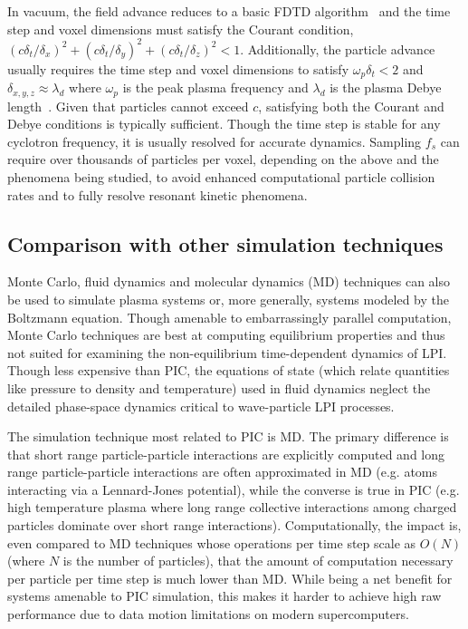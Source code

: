 \documentclass[journal,twoside]{IEEEtran}
\begin{document}
In vacuum, the field advance reduces to a basic FDTD
algorithm~\cite{Yee_1966} and the time step and voxel dimensions must
satisfy the Courant condition, $\left(c\delta_t/\delta_x\right)^2 +
\left(c\delta_t/\delta_y\right)^2 + \left(c\delta_t/\delta_z\right)^2
< 1$.  Additionally, the particle advance usually requires the time
step and voxel dimensions to satisfy $\omega_p \delta_t < 2$ and
$\delta_{x,y,z} \approx \lambda_d$ where $\omega_p$ is the peak plasma
frequency and $\lambda_d$ is the plasma Debye
length~\cite{Birdsall_Langdon_1985,Hockney_Eastwood_1988}.  Given that
particles cannot exceed $c$, satisfying both the Courant and Debye
conditions is typically sufficient.  Though the time step is stable
for any cyclotron frequency, it is usually resolved for accurate
dynamics.  Sampling $f_s$ can require over thousands of particles per
voxel, depending on the above and the phenomena being studied, to avoid
enhanced computational particle collision rates and to fully resolve
resonant kinetic phenomena.

\subsection{Comparison with other simulation techniques}

Monte Carlo, fluid dynamics and molecular dynamics (MD) techniques can
also be used to simulate plasma systems or, more generally, systems
modeled by the Boltzmann equation.  Though amenable to embarrassingly
parallel computation, Monte Carlo techniques are best at computing
equilibrium properties and thus not suited for examining the
non-equilibrium time-dependent dynamics of LPI.  Though less expensive
than PIC, the equations of state (which relate quantities like
pressure to density and temperature) used in fluid dynamics neglect
the detailed phase-space dynamics critical to wave-particle LPI
processes.

The simulation technique most related to PIC is MD.  The primary
difference is that short range particle-particle interactions are
explicitly computed and long range particle-particle interactions are
often approximated in MD (e.g. atoms interacting via a Lennard-Jones
potential), while the converse is true in PIC (e.g. high temperature
plasma where long range collective interactions among charged
particles dominate over short range interactions).  Computationally,
the impact is, even compared to MD techniques whose operations per
time step scale as $O(N)$ (where $N$ is the number of particles), that the
amount of computation necessary per particle per time step is much
lower than MD.  While being a net benefit for systems amenable to PIC
simulation, this makes it harder to achieve high raw performance due
to data motion limitations on modern supercomputers.
\end{document}
